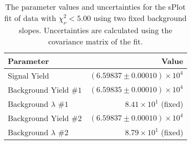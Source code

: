
\begin{table}[ht]
    \begin{center}
        \begin{tabular}{lr}\toprule
            Parameter & Value \\\midrule
            Signal Yield & $(6.59837 \pm 0.00010) \times 10^{4}$ \\
            Background Yield $\#1$ & $(6.59835 \pm 0.00010) \times 10^{4}$ \\
            Background $\lambda$ $\#1$ & $8.41 \times 10^{1}$ (fixed) \\
            Background Yield $\#2$ & $(6.59837 \pm 0.00010) \times 10^{4}$ \\
            Background $\lambda$ $\#2$ & $8.79 \times 10^{1}$ (fixed) \\\bottomrule
        \end{tabular}
        \caption{The parameter values and uncertainties for the sPlot fit of data with $\chi^2_\nu < 5.00$ using two fixed background slopes. Uncertainties are calculated using the covariance matrix of the fit.}\label{tab:splot-fit-results-chisqdof-5.00-fixed-2}
    \end{center}
\end{table}
